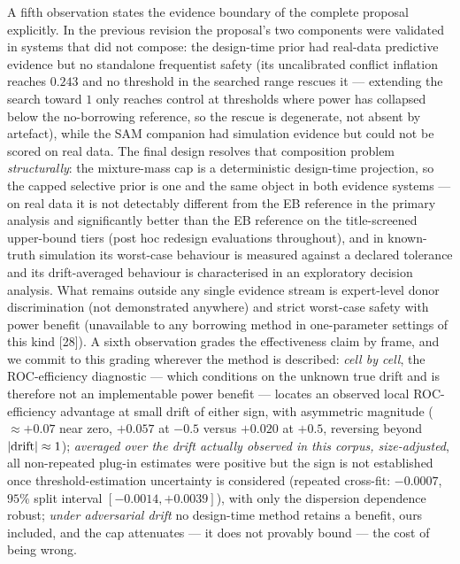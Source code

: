 \documentclass[11pt]{article}
\begin{document}
A fifth observation states the evidence boundary of the complete proposal
explicitly. In the previous revision the proposal's two components were
validated in systems that did not compose: the design-time prior had
real-data predictive evidence but no standalone frequentist safety (its
uncalibrated conflict inflation reaches $0.243$ and no threshold in the
searched range rescues it --- extending the search toward $1$ only reaches
control at thresholds where power has collapsed below the no-borrowing
reference, so the rescue is degenerate, not absent by artefact), while the
SAM companion had simulation evidence but could not be scored on real data.
The final design resolves that composition problem \emph{structurally}: the
mixture-mass cap is a deterministic design-time projection, so the capped
selective prior is one and the same object in both evidence systems --- on
real data it is not detectably different from the EB reference in the
primary analysis and
significantly better
than the EB reference on the title-screened upper-bound tiers (post hoc
redesign evaluations throughout), and in
known-truth simulation its worst-case behaviour is measured against a
declared tolerance and its drift-averaged behaviour is characterised in an
exploratory decision analysis. What
remains outside any single evidence stream is expert-level donor
discrimination (not demonstrated anywhere) and strict worst-case safety
with power benefit (unavailable to any borrowing method in one-parameter
settings of this kind [28]). A sixth
observation grades the effectiveness claim by frame, and we commit to this
grading wherever the method is described: \emph{cell by cell}, the
ROC-efficiency diagnostic --- which conditions on the unknown true drift
and is therefore not an implementable power benefit --- locates an
observed local ROC-efficiency advantage at small drift of either sign,
with asymmetric magnitude ($\approx +0.07$ near zero, $+0.057$ at $-0.5$
versus $+0.020$ at $+0.5$, reversing beyond
$|{\rm drift}| \approx 1$); \emph{averaged over the drift actually
observed in this corpus, size-adjusted}, all non-repeated plug-in
estimates were positive but the sign is not established once
threshold-estimation uncertainty is considered (repeated cross-fit:
$-0.0007$, $95\%$ split interval $[-0.0014,+0.0039]$), with only the
dispersion dependence robust; \emph{under adversarial
drift} no design-time method retains a benefit, ours included, and the cap
attenuates --- it does not provably bound --- the cost
of being wrong.
\end{document}
